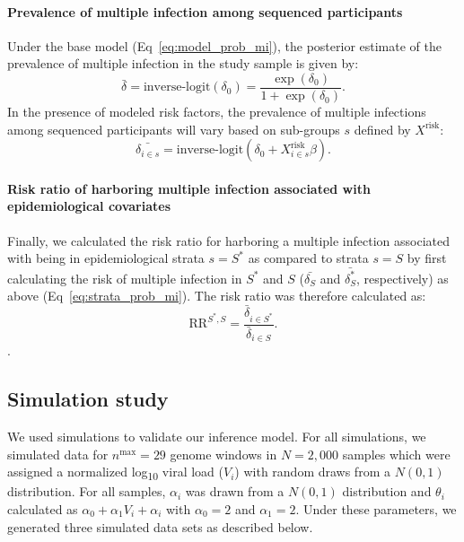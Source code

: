 \documentclass[10pt,letterpaper]{article}
\begin{document}
\paragraph{Prevalence of multiple infection among sequenced participants} 
Under the base model (Eq~\ref{eq:model_prob_mi}), the posterior estimate of the prevalence of multiple infection in the study sample is given by: 
\begin{equation}
    \bar{\delta} = \text{inverse-logit}\left(\delta_0\right) = \frac{\exp(\delta_0)}{1+\exp(\delta_0)}.
\end{equation}
In the presence of modeled risk factors, the prevalence of multiple infections among sequenced participants will vary based on sub-groups $s$ defined by $X^\text{risk}$:
\begin{equation}
    \bar{\delta_{i\in s}} = \text{inverse-logit} \left( \delta_0 + X^\text{risk}_{i\in s} \beta \right). 
    \label{eq:strata_prob_mi}
\end{equation}
\paragraph{Risk ratio of harboring multiple infection associated with epidemiological covariates} Finally, we calculated the risk ratio for harboring a multiple infection associated with being in epidemiological strata $s=S^*$ as compared to strata $s=S$ by first calculating the risk of multiple infection in $S^*$ and $S$ ($\bar{\delta_S}$ and $\bar{\delta_S^*}$, respectively) as above (Eq~\ref{eq:strata_prob_mi}). The risk ratio was therefore calculated as: 
\begin{equation}
    \text{RR}^{S^*,S} = \frac{\bar{\delta}_{i\in S^*}}{\bar{\delta}_{i\in S}}.
\end{equation}.

\subsection{Simulation study}
We used simulations to validate our inference model. For all simulations, we simulated data for ${n^{\text{max}}} = 29$ genome windows in $N = 2,000$ samples which were assigned a normalized log\textsubscript{10} viral load ($V_i$) with random draws from a $N(0,1)$ distribution. For all samples, $\alpha_i$ was drawn from a $N(0,1)$ distribution and $\theta_i$ calculated as $\alpha_0 + \alpha_1 V_i + \alpha_i$ with $\alpha_0 = 2$ and $\alpha_1 = 2$. Under these parameters, we generated three simulated data sets as described below.
\end{document}
